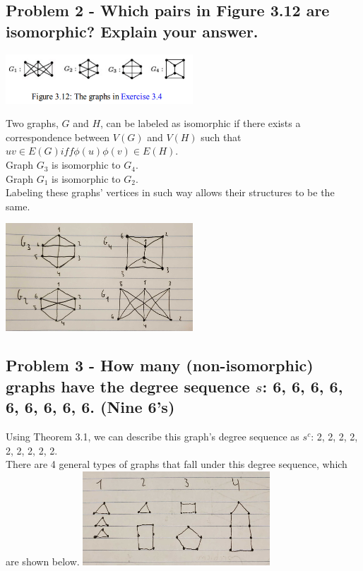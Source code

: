 \documentclass[10pt,a4paper]{article}
\begin{document}
\subsection*{\newpage Problem 2 - Which pairs in Figure 3.12 are isomorphic? Explain your answer.}
\includegraphics[width = 7cm]{fig312}

Two graphs, $G$ and $H$, can be labeled as isomorphic if there exists a correspondence between $V(G)$ and $V(H)$ such that 
$uv \in E(G) iff \phi(u)\phi(v) \in E(H)$. \\

Graph $G_{3}$ is isomorphic to $G_{4}$.\\
Graph $G_{1}$ is isomorphic to $G_{2}$.\\

Labeling these graphs' vertices in such way allows their structures to be the same.

\includegraphics[width = 7cm]{problem2}

\subsection*{Problem 3 - How many (non-isomorphic) graphs have the degree sequence $s$: 6, 6, 6, 6, 6, 6, 6, 6, 6. (Nine 6's)}
Using Theorem 3.1, we can describe this graph's degree sequence as $s^{c}$: 2, 2, 2, 2, 2, 2, 2, 2, 2. \\
There are 4 general types of graphs that fall under this degree sequence, which are shown below. 
\includegraphics[width = 7cm]{problem3}
\end{document}
